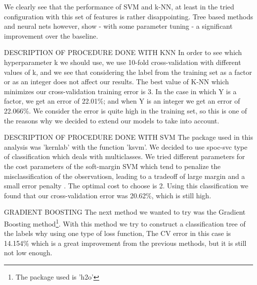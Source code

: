 \documentclass[paper=a4, fontsize=11pt]{scrartcl}
\numberwithin{equation}{section}
\numberwithin{figure}{section}
\numberwithin{table}{section}
\begin{document}
We clearly see that the performance of SVM and k-NN, at least in the tried configuration with this set of features is rather disappointing. Tree based methods  and neural nets however, show - with some parameter tuning - a significant improvement over the baseline. 
 \newpage




DESCRIPTION OF PROCEDURE DONE WITH KNN
 In order to see which hyperparameter k we should use, we use 10-fold cross-validation with different values of k, and we see that considering the label from the training set as a factor or as an integer does not affect our results. The best value of K-NN which minimizes our cross-validation training error is 3. In the case in which Y is a factor, we get an error of 22.01\%; and when Y is an integer we get an error of 22.066\%. We consider the error is quite high in the training set, so this is one of the reasons why we decided to extend our models to take into account. 



DESCRIPTION OF PROCEDURE DONE WITH SVM
 The package used in this analysis was 'kernlab' with the function 'ksvm'. We decided to use spoc-svc type of classification which deals with multiclasses.  We tried different parameters for the cost parameters of the soft-margin SVM which tend to penalize the misclassification of the observatiosn, leading to a tradeoff of large margin and a small error penalty . The optimal cost to choose is 2. Using this classification we found that our cross-validation error was 20.62\%, which is still high. 



GRADIENT BOOSTING
The next method we wanted to try was the Gradient Boosting method\footnote{The package used is 'h2o'}. 
With this method we try to construct a classification tree of the labels why using one type of loss function, 
The CV error in this case is 14.154\% which is a great improvement from the previous methods, but it is still not low enough. 



\end{document}
